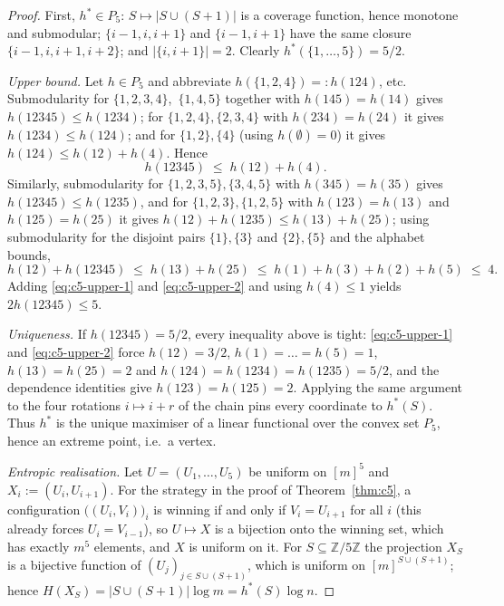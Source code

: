\documentclass[11pt]{article}
\theoremstyle{plain}
\theoremstyle{definition}
\theoremstyle{definition}
\theoremstyle{remark}
\begin{document}
\begin{proof}
First, $h^*\in P_5$: $S\mapsto|S\cup(S+1)|$ is a coverage function, hence monotone and
submodular; $\{i-1,i,i+1\}$ and $\{i-1,i+1\}$ have the same closure $\{i-1,i,i+1,i+2\}$; and
$|\{i,i+1\}|=2$.  Clearly $h^*(\{1,\dots,5\})=5/2$.

\smallskip
\noindent\emph{Upper bound.}
Let $h\in P_5$ and abbreviate $h(\{1,2,4\})=:h(124)$, etc.
Submodularity for $\{1,2,3,4\}$,\allowbreak\ $\{1,4,5\}$ together with $h(145)=h(14)$ gives
$h(12345)\le h(1234)$; for $\{1,2,4\},\{2,3,4\}$ with $h(234)=h(24)$ it gives
$h(1234)\le h(124)$; and for $\{1,2\},\{4\}$ (using $h(\emptyset)=0$) it gives
$h(124)\le h(12)+h(4)$.  Hence
\begin{equation}\label{eq:c5-upper-1}
  h(12345)\;\le\;h(12)+h(4).
\end{equation}
Similarly, submodularity for $\{1,2,3,5\},\{3,4,5\}$ with $h(345)=h(35)$ gives
$h(12345)\le h(1235)$, and for $\{1,2,3\},\{1,2,5\}$ with $h(123)=h(13)$ and $h(125)=h(25)$ it
gives $h(12)+h(1235)\le h(13)+h(25)$; using submodularity for the disjoint pairs
$\{1\},\{3\}$ and $\{2\},\{5\}$ and the alphabet bounds,
\begin{equation}\label{eq:c5-upper-2}
  h(12)+h(12345)\;\le\;h(13)+h(25)\;\le\;h(1)+h(3)+h(2)+h(5)\;\le\;4.
\end{equation}
Adding \eqref{eq:c5-upper-1} and \eqref{eq:c5-upper-2} and using $h(4)\le1$ yields
$2h(12345)\le 5$.

\smallskip
\noindent\emph{Uniqueness.}
If $h(12345)=5/2$, every inequality above is tight: \eqref{eq:c5-upper-1} and
\eqref{eq:c5-upper-2} force $h(12)=3/2$, $h(1)=\dots=h(5)=1$, $h(13)=h(25)=2$ and
$h(124)=h(1234)=h(1235)=5/2$, and the dependence identities give $h(123)=h(125)=2$.
Applying the same argument to the four rotations $i\mapsto i+r$ of the chain pins every
coordinate to $h^*(S)$.  Thus $h^*$ is the unique maximiser of a linear functional over the
convex set $P_5$, hence an extreme point, i.e.\ a vertex.

\smallskip
\noindent\emph{Entropic realisation.}
Let $U=(U_1,\dots,U_5)$ be uniform on $[m]^5$ and $X_i:=(U_i,U_{i+1})$.  For the strategy in
the proof of Theorem~\ref{thm:c5}, a configuration $\bigl((U_i,V_i)\bigr)_i$ is winning if and
only if $V_i=U_{i+1}$ for all $i$ (this already forces $U_i=V_{i-1}$), so $U\mapsto X$ is a
bijection onto the winning set, which has exactly $m^5$ elements, and $X$ is uniform on it.
For $S\subseteq\mathbb Z/5\mathbb Z$ the projection $X_S$ is a bijective function of
$(U_j)_{j\in S\cup(S+1)}$, which is uniform on $[m]^{S\cup(S+1)}$; hence
$H(X_S)=|S\cup(S+1)|\log m=h^*(S)\log n$.
\end{proof}
\end{document}
